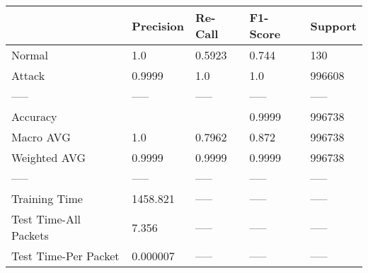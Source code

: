 \begin{tabular}{lllll}
\toprule
{} & Precision & Re-Call & F1-Score & Support \\
\midrule
Normal                &       1.0 &  0.5923 &    0.744 &     130 \\
Attack                &    0.9999 &     1.0 &      1.0 &  996608 \\
-----                 &     ----- &   ----- &    ----- &   ----- \\
Accuracy              &           &         &   0.9999 &  996738 \\
Macro AVG             &       1.0 &  0.7962 &    0.872 &  996738 \\
Weighted AVG          &    0.9999 &  0.9999 &   0.9999 &  996738 \\
-----                 &     ----- &   ----- &    ----- &   ----- \\
Training Time         &  1458.821 &   ----- &    ----- &   ----- \\
Test Time-All Packets &     7.356 &   ----- &    ----- &   ----- \\
Test Time-Per Packet  &  0.000007 &   ----- &    ----- &   ----- \\
\bottomrule
\end{tabular}

